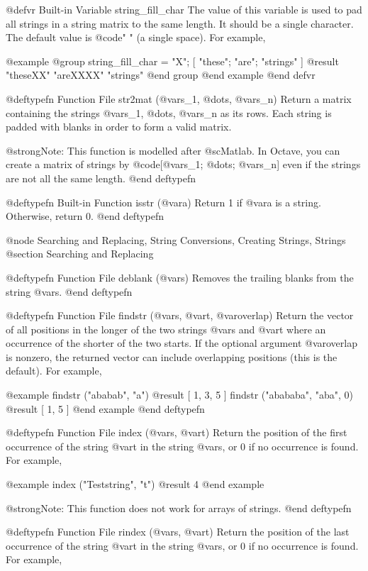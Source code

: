 {{{{@defvr {Built-in Variable} string_fill_char
The value of this variable is used to pad all strings in a string matrix
to the same length.  It should be a single character.  The default value
is @code{" "} (a single space).  For example,

@example
@group
string_fill_char = "X";
[ "these"; "are"; "strings" ]
     @result{} "theseXX"
        "areXXXX"
        "strings"
@end group
@end example
@end defvr

@deftypefn {Function File} {} str2mat (@var{s_1}, @dots{}, @var{s_n})
Return a matrix containing the strings @var{s_1}, @dots{}, @var{s_n} as
its rows.  Each string is padded with blanks in order to form a valid
matrix.

@strong{Note:}
This function is modelled after @sc{Matlab}.  In Octave, you can create
a matrix of strings by @code{[@var{s_1}; @dots{}; @var{s_n}]} even if
the strings are not all the same length.
@end deftypefn

@deftypefn {Built-in Function} {} isstr (@var{a})
Return 1 if @var{a} is a string.  Otherwise, return 0.
@end deftypefn

@node Searching and Replacing, String Conversions, Creating Strings, Strings
@section Searching and Replacing

@deftypefn {Function File} {} deblank (@var{s})
Removes the trailing blanks from the string @var{s}. 
@end deftypefn

@deftypefn {Function File} {} findstr (@var{s}, @var{t}, @var{overlap})
Return the vector of all positions in the longer of the two strings
@var{s} and @var{t} where an occurrence of the shorter of the two starts.
If the optional argument @var{overlap} is nonzero, the returned vector
can include overlapping positions (this is the default).  For example,

@example
findstr ("ababab", "a")
     @result{} [ 1, 3, 5 ]
findstr ("abababa", "aba", 0)
     @result{} [ 1, 5 ]
@end example
@end deftypefn

@deftypefn {Function File} {} index (@var{s}, @var{t})
Return the position of the first occurrence of the string @var{t} in the
string @var{s}, or 0 if no occurrence is found.  For example,

@example
index ("Teststring", "t")
     @result{} 4
@end example

@strong{Note:}  This function does not work for arrays of strings.
@end deftypefn

@deftypefn {Function File} {} rindex (@var{s}, @var{t})
Return the position of the last occurrence of the string @var{t} in the
string @var{s}, or 0 if no occurrence is found.  For example,

}}}}
